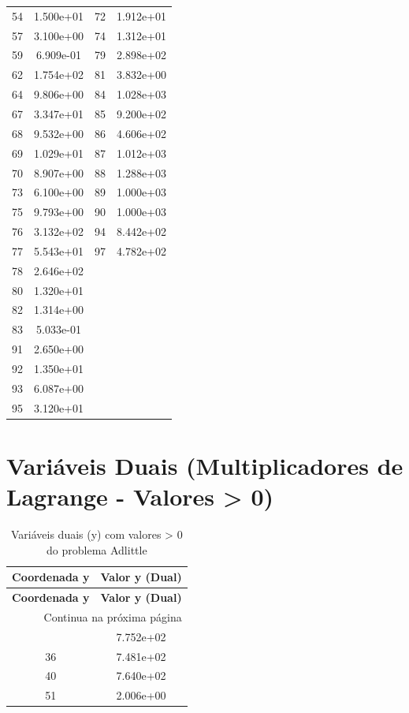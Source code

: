 \documentclass[12pt]{article}
\begin{document}
\begin{longtable}{@{}cccc@{}}
54 & 1.500e+01 & 72 & 1.912e+01 \\
57 & 3.100e+00 & 74 & 1.312e+01 \\
59 & 6.909e-01 & 79 & 2.898e+02 \\
62 & 1.754e+02 & 81 & 3.832e+00 \\
64 & 9.806e+00 & 84 & 1.028e+03 \\
67 & 3.347e+01 & 85 & 9.200e+02 \\
68 & 9.532e+00 & 86 & 4.606e+02 \\
69 & 1.029e+01 & 87 & 1.012e+03 \\
70 & 8.907e+00 & 88 & 1.288e+03 \\
73 & 6.100e+00 & 89 & 1.000e+03 \\
75 & 9.793e+00 & 90 & 1.000e+03 \\
76 & 3.132e+02 & 94 & 8.442e+02 \\
77 & 5.543e+01 & 97 & 4.782e+02 \\
78 & 2.646e+02 &  &  \\
80 & 1.320e+01 &  &  \\
82 & 1.314e+00 &  &  \\
83 & 5.033e-01 &  &  \\
91 & 2.650e+00 &  &  \\
92 & 1.350e+01 &  &  \\
93 & 6.087e+00 &  &  \\
95 & 3.120e+01 &  &  \\

\bottomrule
\end{longtable}


\section{Variáveis Duais (Multiplicadores de Lagrange - Valores > 0)}

\begin{longtable}{@{}cc@{}}
\caption{Variáveis duais (y) com valores > 0 do problema Adlittle} \\
\toprule
\textbf{Coordenada y} & \textbf{Valor y (Dual)} \\
\midrule
\endfirsthead

\toprule
\textbf{Coordenada y} & \textbf{Valor y (Dual)} \\
\midrule
\endhead

\midrule \multicolumn{2}{r}{{Continua na próxima página}} \\ \midrule
\endfoot

\bottomrule
\endlastfoot
2 & 7.752e+02 \\
36 & 7.481e+02 \\
40 & 7.640e+02 \\
51 & 2.006e+00 \\

\bottomrule
\end{longtable}
\end{document}
